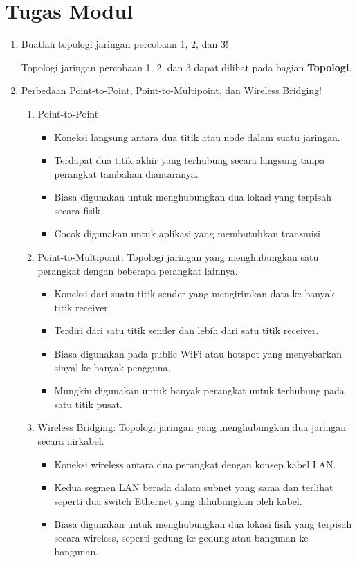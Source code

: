 \section*{Tugas Modul} %
\begin{enumerate}
  \item Buatlah topologi jaringan percobaan 1, 2, dan 3!
  
  Topologi jaringan percobaan 1, 2, dan 3 dapat dilihat pada bagian \textbf{Topologi}.

  \item Perbedaan Point-to-Point, Point-to-Multipoint, dan Wireless Bridging!
      \begin{enumerate}
          \item Point-to-Point
          \begin{itemize}
              \item Koneksi langsung antara dua titik atau node dalam suatu jaringan.
              \item Terdapat dua titik akhir yang terhubung secara langsung tanpa perangkat tambahan diantaranya.
              \item Biasa digunakan untuk menghubungkan dua lokasi yang terpisah secara fisik.
              \item Cocok digunakan untuk aplikasi yang membutuhkan transmisi
          \end{itemize}
          \item Point-to-Multipoint: Topologi jaringan yang menghubungkan satu perangkat dengan beberapa perangkat lainnya.
          \begin{itemize}
              \item Koneksi dari suatu titik sender  yang mengirimkan data ke banyak titik receiver.
              \item Terdiri dari satu titik sender dan lebih dari satu titik receiver.
              \item Biasa digunakan pada public WiFi atau hotspot yang menyebarkan sinyal ke banyak pengguna.
              \item Mungkin digunakan untuk banyak perangkat untuk terhubung pada satu titik pusat.
          \end{itemize}
          \item Wireless Bridging: Topologi jaringan yang menghubungkan dua jaringan secara nirkabel.
          \begin{itemize}
              \item Koneksi wireless antara dua perangkat dengan konsep kabel LAN.
              \item Kedua segmen LAN berada dalam subnet yang sama dan terlihat seperti dua switch Ethernet yang dihubungkan oleh kabel.
              \item Biasa digunakan untuk menghubungkan dua lokasi fisik yang terpisah secara wireless, seperti gedung ke gedung atau bangunan ke bangunan.
          \end{itemize}
      \end{enumerate}
        

\end{enumerate}
